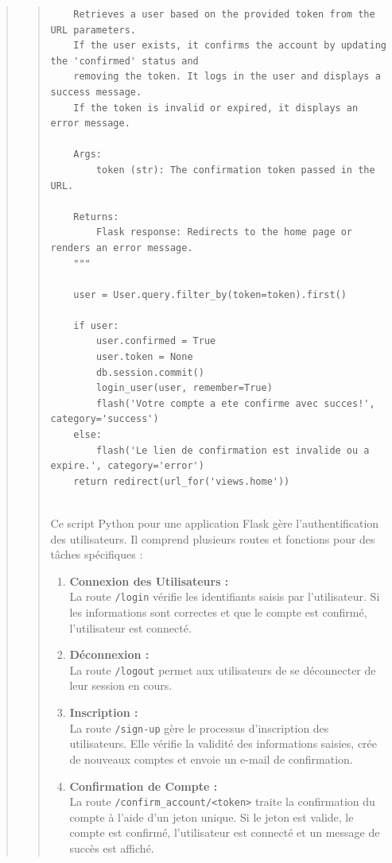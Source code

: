 \documentclass{article}
\begin{document}
\begin{quote}
\begin{quote}
\begin{tcolorbox}[colback=grisClair,colframe=black]
\begin{lstlisting}
    Retrieves a user based on the provided token from the URL parameters.
    If the user exists, it confirms the account by updating the 'confirmed' status and
    removing the token. It logs in the user and displays a success message.
    If the token is invalid or expired, it displays an error message.

    Args:
        token (str): The confirmation token passed in the URL.

    Returns:
        Flask response: Redirects to the home page or renders an error message.
    """
        
    user = User.query.filter_by(token=token).first()

    if user:
        user.confirmed = True
        user.token = None  
        db.session.commit()
        login_user(user, remember=True)
        flash('Votre compte a ete confirme avec succes!', category='success')
    else:
        flash('Le lien de confirmation est invalide ou a expire.', category='error')
    return redirect(url_for('views.home'))


    \end{lstlisting}       
    \end{tcolorbox}
    \newpage
    Ce script Python pour une application Flask gère l'authentification des utilisateurs. Il comprend plusieurs routes et fonctions pour des tâches spécifiques :
    \vspace*{1\baselineskip}
    \begin{enumerate}
    \vspace*{1\baselineskip}
    \item \textbf{Connexion des Utilisateurs :}\\
        La route \texttt{/login} vérifie les identifiants saisis par l'utilisateur. Si les informations sont correctes et que le compte est confirmé, l'utilisateur est connecté.
    \vspace*{1\baselineskip}
        
        \item \textbf{Déconnexion :}\\
        La route \texttt{/logout} permet aux utilisateurs de se déconnecter de leur session en cours.
    \vspace*{1\baselineskip}
        
        \item \textbf{Inscription :}\\
        La route \texttt{/sign-up} gère le processus d'inscription des utilisateurs. Elle vérifie la validité des informations saisies, crée de nouveaux comptes et envoie un e-mail de confirmation.
\\
        \item \textbf{Confirmation de Compte :}\\
        La route \texttt{/confirm\_account/<token>} traite la confirmation du compte à l'aide d'un jeton unique. Si le jeton est valide, le compte est confirmé, l'utilisateur est connecté et un message de succès est affiché.
    \vspace*{1\baselineskip}
        

\end{enumerate}
\end{quote}
\end{quote}
\end{document}
